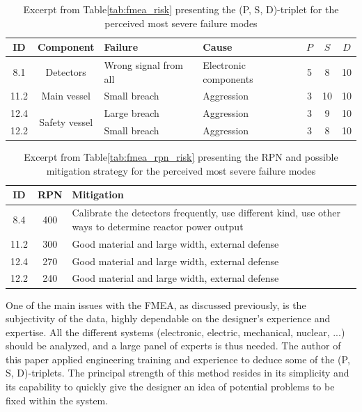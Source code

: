 \begin{table}[!htb]
    \centering
        \begin{tabular}{ccp{4cm}p{4cm}ccc}
            \hline
            ID & Component & Failure & Cause & $P$ & $S$ & $D$ \\ \hline \hline
            8.1 & \multirow{1}{3cm}{Detectors}  & Wrong signal from all & Electronic components & 5 & 8 & 10 \\ \hline
            11.2 & \multirow{1}{3cm}{Main vessel} & Small breach & Aggression & 3 & 10 & 10 \\ \hline
            12.4 & \multirow{2}{3cm}{Safety vessel}  & Large breach & Aggression & 3 & 9 & 10 \\ 
            12.2 &                                   & Small breach & Aggression & 3 & 8 & 10 \\
        \end{tabular}
        \caption{Excerpt from Table\ref{tab:fmea_risk} presenting the (P, S, D)-triplet for the perceived most severe failure modes}\label{tab:excerpt_fmea}
\end{table}


\begin{table}[!htb]
    \centering
        \begin{tabular}{ccp{10cm}}
            \hline
            ID & RPN & Mitigation \\ \hline\hline
            8.4 & 400  & Calibrate the detectors frequently, use different kind, use other ways to determine reactor power output \\
            11.2 & 300 & Good material and large width, external defense \\
            12.4 & 270 & Good material and large width, external defense \\
            12.2 & 240 & Good material and large width, external defense \\
        \end{tabular}
        \caption{Excerpt from Table\ref{tab:fmea_rpn_risk} presenting the RPN and possible mitigation strategy for the perceived most severe failure modes}\label{tab:excerpt_rpn_fmea}
\end{table}

One of the main issues with the FMEA, as discussed previously, is the subjectivity of the data, highly dependable on the designer's experience and expertise. All the different systems (electronic, electric, mechanical, nuclear, ...) should be analyzed, and a large panel of experts is thus needed. The author of this paper applied engineering training and experience to deduce some of the (P, S, D)-triplets. The principal strength of this method resides in its simplicity and its capability to quickly give the designer an idea of potential problems to be fixed within the system.

